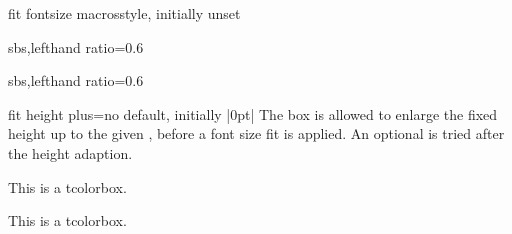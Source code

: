 \begin{docTcbKey}{fit fontsize macros}{}{style, initially unset}
\begin{dispExample*}{sbs,lefthand ratio=0.6}
\end{dispExample*}


\begin{dispExample*}{sbs,lefthand ratio=0.6}

\tcboxfit[height=5cm,
  fit fontsize macros,
  fonttitle=\normalsize\bfseries,
  title=Adapted title]
{\lipsum[2]}

\end{dispExample*}
\end{docTcbKey}


 
\begin{docTcbKey}{fit height plus}{=}{no default, initially |0pt|}
  The box is allowed to enlarge the fixed height up to the given ,
  before a font size fit is applied. An optional 
  is tried after the height adaption.
\begin{dispExample}

\begin{tcolorbox}[fit]
This is a tcolorbox.
\end{tcolorbox}
\begin{tcolorbox}[fit,fit height plus=1cm]
This is a tcolorbox.
\end{tcolorbox}
\begin{tcolorbox}[fit]
\lipsum[2]
\end{tcolorbox}
\begin{tcolorbox}[fit,fit height plus=1cm]
\lipsum[2]
\end{tcolorbox}
\end{dispExample}
\end{docTcbKey}


